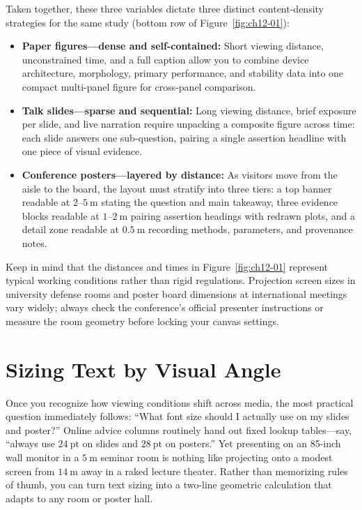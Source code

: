 Taken together, these three variables dictate three distinct content-density strategies for the same study (bottom row of Figure~\ref{fig:ch12-01}):
\begin{itemize}
\item \textbf{Paper figures---dense and self-contained:} Short viewing distance, unconstrained time, and a full caption allow you to combine device architecture, morphology, primary performance, and stability data into one compact multi-panel figure for cross-panel comparison.
\item \textbf{Talk slides---sparse and sequential:} Long viewing distance, brief exposure per slide, and live narration require unpacking a composite figure across time: each slide answers one sub-question, pairing a single assertion headline with one piece of visual evidence.
\item \textbf{Conference posters---layered by distance:} As visitors move from the aisle to the board, the layout must stratify into three tiers: a top banner readable at $2\text{--}5\ \text{m}$ stating the question and main takeaway, three evidence blocks readable at $1\text{--}2\ \text{m}$ pairing assertion headings with redrawn plots, and a detail zone readable at $0.5\ \text{m}$ recording methods, parameters, and provenance notes.
\end{itemize}

Keep in mind that the distances and times in Figure~\ref{fig:ch12-01} represent typical working conditions rather than rigid regulations. Projection screen sizes in university defense rooms and poster board dimensions at international meetings vary widely; always check the conference's official presenter instructions or measure the room geometry before locking your canvas settings.

\section{Sizing Text by Visual Angle}

Once you recognize how viewing conditions shift across media, the most practical question immediately follows: ``What font size should I actually use on my slides and poster?'' Online advice columns routinely hand out fixed lookup tables---say, ``always use $24\ \text{pt}$ on slides and $28\ \text{pt}$ on posters.'' Yet presenting on an 85-inch wall monitor in a $5\ \text{m}$ seminar room is nothing like projecting onto a modest screen from $14\ \text{m}$ away in a raked lecture theater. Rather than memorizing rules of thumb, you can turn text sizing into a two-line geometric calculation that adapts to any room or poster hall.

